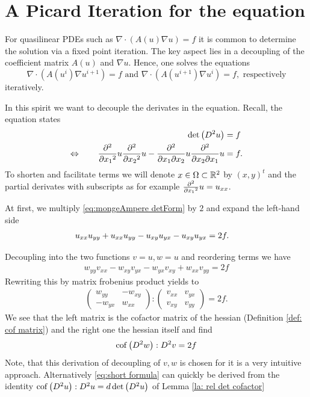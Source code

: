 \section{A Picard Iteration for the \MA equation}

For quasilinear PDEs such as $\nabla \cdot (A(u) \nabla u ) = f$ it is common to determine the solution via a fixed point iteration. The key aspect lies in a decoupling of the coefficient matrix $A(u)$ and $\nabla u$. Hence, one solves the equations
\[
	\nabla \cdot (A(u^{i} )\nabla u^{i+1}) = f  \text{ and } \nabla \cdot (A(u^{i+1}) \nabla u^{i}) = f, \text{ respectively}
\] 
iteratively.

In this spirit we want to decouple the derivates in the \MA equation. Recall, the \MA equation states
\begin{align}
 \det{\left(D^2 u\right)} &= f \nonumber \\
 	\Leftrightarrow \qquad  \frac {\partial^2} {\partial {x_1}^2} u \frac {\partial^2} {\partial {x_2}^2} u -\frac {\partial^2} {\partial x_1\partial x_2} u \frac {\partial^2} {\partial x_2\partial x_1} u  &= f. \label{eq:mongeAmpere detForm}
\end{align}
To shorten and facilitate terms we will denote $x \in \Omega \subset {\mathbb{R}^2} $ by $(x,y)^t$ and the partial derivates with subscripts as for example $\frac {\partial^2} {\partial {x_1}^2} u = u_{xx}$.

At first, we multiply \eqref{eq:mongeAmpere detForm} by $2$ and expand the left-hand side
\begin{align}
 	u_{x x } u_{y y }+u_{x x } u_{y y } -u_{x y } u_{y x } -u_{x y } u_{y x } &=2 f. 
\end{align}

Decoupling into the two functions $v = u ,w = u$ and reordering terms we have
\begin{align}
	w_{yy} v_{xx}- w_{xy} v_{yx} - w_{yx} v_{xy} +w_{xx} v_{yy} = 2f \label{eq:decoupled PDE start}
\end{align}
Rewriting this by matrix frobenius product yields to
\begin{align}
 \begin{pmatrix} w_{yy} & -w_{xy}  \\ -w_{yx} & w_{xx} \end{pmatrix}: \begin{pmatrix} v_{xx} & v_{yx}  \\  v_{xy} & v_{yy} \end{pmatrix} = 2f.
\end{align}
We see that the left matrix is the cofactor matrix of the hessian (Definition \ref{def: cof matrix}) and the right one the hessian itself and find
\begin{align}
		\operatorname{cof} \left( D^2 w  \right):D^2 v  = 2f  \label{eq:short formula}
\end{align}
Note, that this derivation of decoupling of $v,w$ is chosen for it is a very intuitive approach. Alternatively \eqref{eq:short formula} can quickly be derived from the identity $\operatorname{cof} \left( D^2 u  \right):D^2 u  = d \det{\left(D^2 u\right)}$ of Lemma \ref{la: rel det cofactor}

